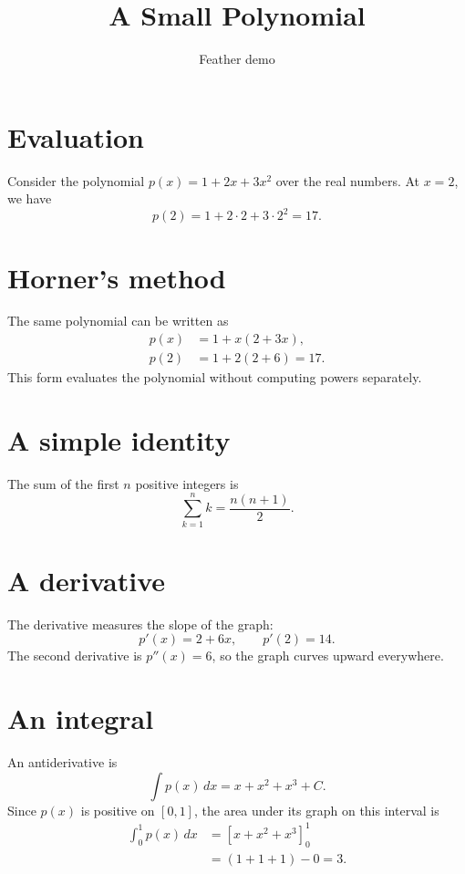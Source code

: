 \documentclass[11pt]{article}
\title{A Small Polynomial}
\author{Feather demo}
\date{}
\begin{document}
\maketitle

\section{Evaluation}
Consider the polynomial $p(x) = 1 + 2x + 3x^2$ over the real numbers.
At $x = 2$, we have
\[
p(2) = 1 + 2 \cdot 2 + 3 \cdot 2^2 = 17.
\]

\section{Horner's method}
The same polynomial can be written as
\begin{align*}
p(x) &= 1 + x(2 + 3x), \\
p(2) &= 1 + 2(2 + 6) = 17.
\end{align*}
This form evaluates the polynomial without computing powers separately.

\section{A simple identity}
The sum of the first $n$ positive integers is
\[
\sum_{k=1}^{n} k = \frac{n(n+1)}{2}.
\]

\section{A derivative}
The derivative measures the slope of the graph:
\[
p'(x) = 2 + 6x, \qquad p'(2) = 14.
\]
The second derivative is $p''(x) = 6$, so the graph curves upward everywhere.

\section{An integral}
An antiderivative is
\[
\int p(x)\,dx = x + x^2 + x^3 + C.
\]
Since $p(x)$ is positive on $[0,1]$, the area under its graph on this interval is
\begin{align*}
\int_0^1 p(x)\,dx
  &= \left[x + x^2 + x^3\right]_0^1 \\
  &= (1 + 1 + 1) - 0 = 3.
\end{align*}
\end{document}
